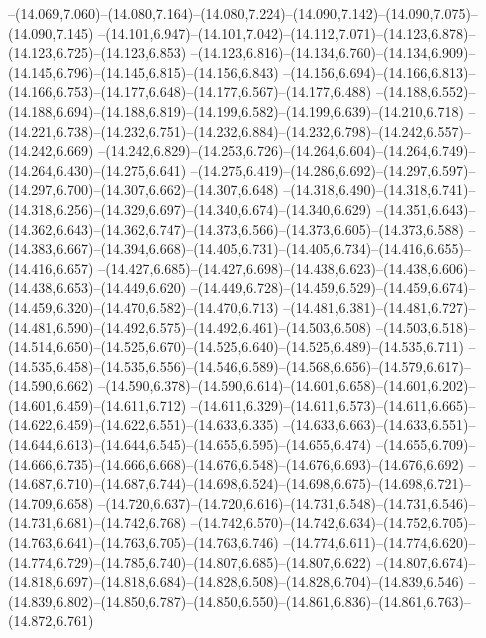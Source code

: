  --(14.069,7.060)--(14.080,7.164)--(14.080,7.224)--(14.090,7.142)--(14.090,7.075)--(14.090,7.145)%
  --(14.101,6.947)--(14.101,7.042)--(14.112,7.071)--(14.123,6.878)--(14.123,6.725)--(14.123,6.853)%
  --(14.123,6.816)--(14.134,6.760)--(14.134,6.909)--(14.145,6.796)--(14.145,6.815)--(14.156,6.843)%
  --(14.156,6.694)--(14.166,6.813)--(14.166,6.753)--(14.177,6.648)--(14.177,6.567)--(14.177,6.488)%
  --(14.188,6.552)--(14.188,6.694)--(14.188,6.819)--(14.199,6.582)--(14.199,6.639)--(14.210,6.718)%
  --(14.221,6.738)--(14.232,6.751)--(14.232,6.884)--(14.232,6.798)--(14.242,6.557)--(14.242,6.669)%
  --(14.242,6.829)--(14.253,6.726)--(14.264,6.604)--(14.264,6.749)--(14.264,6.430)--(14.275,6.641)%
  --(14.275,6.419)--(14.286,6.692)--(14.297,6.597)--(14.297,6.700)--(14.307,6.662)--(14.307,6.648)%
  --(14.318,6.490)--(14.318,6.741)--(14.318,6.256)--(14.329,6.697)--(14.340,6.674)--(14.340,6.629)%
  --(14.351,6.643)--(14.362,6.643)--(14.362,6.747)--(14.373,6.566)--(14.373,6.605)--(14.373,6.588)%
  --(14.383,6.667)--(14.394,6.668)--(14.405,6.731)--(14.405,6.734)--(14.416,6.655)--(14.416,6.657)%
  --(14.427,6.685)--(14.427,6.698)--(14.438,6.623)--(14.438,6.606)--(14.438,6.653)--(14.449,6.620)%
  --(14.449,6.728)--(14.459,6.529)--(14.459,6.674)--(14.459,6.320)--(14.470,6.582)--(14.470,6.713)%
  --(14.481,6.381)--(14.481,6.727)--(14.481,6.590)--(14.492,6.575)--(14.492,6.461)--(14.503,6.508)%
  --(14.503,6.518)--(14.514,6.650)--(14.525,6.670)--(14.525,6.640)--(14.525,6.489)--(14.535,6.711)%
  --(14.535,6.458)--(14.535,6.556)--(14.546,6.589)--(14.568,6.656)--(14.579,6.617)--(14.590,6.662)%
  --(14.590,6.378)--(14.590,6.614)--(14.601,6.658)--(14.601,6.202)--(14.601,6.459)--(14.611,6.712)%
  --(14.611,6.329)--(14.611,6.573)--(14.611,6.665)--(14.622,6.459)--(14.622,6.551)--(14.633,6.335)%
  --(14.633,6.663)--(14.633,6.551)--(14.644,6.613)--(14.644,6.545)--(14.655,6.595)--(14.655,6.474)%
  --(14.655,6.709)--(14.666,6.735)--(14.666,6.668)--(14.676,6.548)--(14.676,6.693)--(14.676,6.692)%
  --(14.687,6.710)--(14.687,6.744)--(14.698,6.524)--(14.698,6.675)--(14.698,6.721)--(14.709,6.658)%
  --(14.720,6.637)--(14.720,6.616)--(14.731,6.548)--(14.731,6.546)--(14.731,6.681)--(14.742,6.768)%
  --(14.742,6.570)--(14.742,6.634)--(14.752,6.705)--(14.763,6.641)--(14.763,6.705)--(14.763,6.746)%
  --(14.774,6.611)--(14.774,6.620)--(14.774,6.729)--(14.785,6.740)--(14.807,6.685)--(14.807,6.622)%
  --(14.807,6.674)--(14.818,6.697)--(14.818,6.684)--(14.828,6.508)--(14.828,6.704)--(14.839,6.546)%
  --(14.839,6.802)--(14.850,6.787)--(14.850,6.550)--(14.861,6.836)--(14.861,6.763)--(14.872,6.761)%
